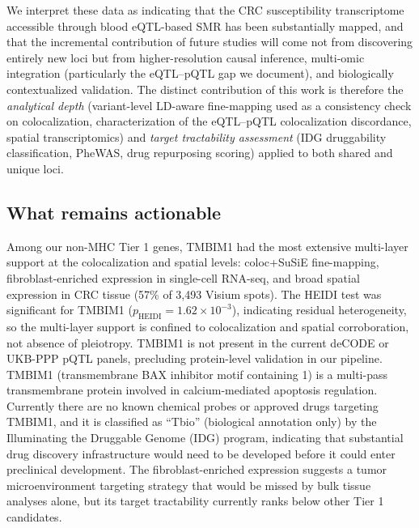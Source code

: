 \documentclass[11pt,a4paper]{article}
\begin{document}
We interpret these data as indicating that the CRC susceptibility
transcriptome accessible through blood eQTL-based SMR has been substantially
mapped, and that the incremental contribution of future studies will come not
from discovering entirely new loci but from higher-resolution causal inference,
multi-omic integration (particularly the eQTL--pQTL gap we document), and
biologically contextualized validation. The distinct contribution of this
work is therefore the \textit{analytical depth} (variant-level LD-aware
fine-mapping used as a consistency check on colocalization, characterization of
the eQTL--pQTL colocalization discordance, spatial transcriptomics) and
\textit{target tractability assessment} (IDG druggability classification, PheWAS,
drug repurposing scoring) applied to both shared and unique loci.

\subsection*{What remains actionable}

Among our non-MHC Tier 1 genes, TMBIM1 had the most extensive multi-layer
support at the colocalization and spatial levels: coloc+SuSiE fine-mapping,
fibroblast-enriched expression in single-cell RNA-seq, and broad spatial
expression in CRC tissue (57\% of 3,493 Visium spots). The HEIDI test was
significant for TMBIM1 ($p_{\text{HEIDI}} = 1.62 \times 10^{-3}$), indicating
residual heterogeneity, so the multi-layer support is confined to
colocalization and spatial corroboration, not absence of pleiotropy.
TMBIM1 is not present
in the current deCODE or UKB-PPP pQTL panels, precluding protein-level
validation in our pipeline. TMBIM1 (transmembrane BAX inhibitor motif
containing 1) is a multi-pass transmembrane protein involved in
calcium-mediated apoptosis regulation. Currently there are no known chemical
probes or approved drugs targeting TMBIM1, and it is classified as
``Tbio'' (biological annotation only) by the Illuminating the Druggable
Genome (IDG) program, indicating that substantial drug discovery
infrastructure would need to be developed before it could enter preclinical
development. The fibroblast-enriched expression suggests a tumor
microenvironment targeting strategy that would be missed by bulk tissue
analyses alone, but its target tractability currently ranks below other Tier 1
candidates.
\end{document}

